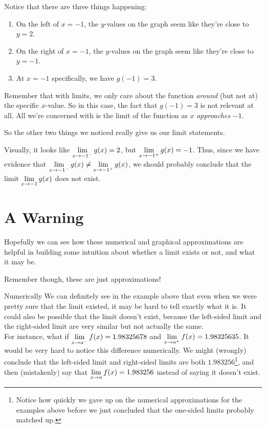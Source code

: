 Notice that there are three things happening:
\begin{enumerate}
  \item On the left of $x=-1$, the $y$-values on the graph seem like they're close to $y=2$.
  \item On the right of $x=-1$, the $y$-values on the graph seem like they're close to $y=-1$.
  \item At $x=-1$ specifically, we have $g(-1)=3$.
\end{enumerate}

Remember that with limits, we only care about the function \textit{around} (but not at) the specific $x$-value.
So in this case, the fact that $g(-1)=3$ is not relevant at all.
All we're concerned with is the limit of the function as $x$ \textit{approaches} $-1$.

So the other two things we noticed really give us our limit statements.

Visually, it looks like $\displaystyle \lim_{x\to -1^-} g(x) = 2$, but $\displaystyle \lim_{x\to -1^+} g(x) = -1$. Thus, since we have evidence that $\displaystyle \lim_{x\to -1^-} g(x) \neq \displaystyle \lim_{x\to -1^+} g(x)$, we should probably conclude that the limit $\displaystyle \lim_{x\to -1} g(x)$ does not exist.

\section*{A Warning}

Hopefully we can see how these numerical and graphical approximations are helpful in building some intuition about whether a limit exists or not, and what it may be.

Remember though, these are just approximations!
\begin{defn}{Numerically}
  We can definitely see in the example above that even when we were pretty sure that the limit existed, it may be hard to tell exactly what it is.
  It could also be possible that the limit doesn't exist, because the left-sided limit and the right-sided limit are very similar but not actually the same.\\

  For instance, what if $\displaystyle \lim_{x\to a^-} f(x) = 1.98325678$ and $\displaystyle \lim_{x\to a^+} f(x) = 1.98325635$.
  It would be very hard to notice this difference numerically.
  We might (wrongly) conclude that the left-sided limit and right-sided limits are both $1.983256$\footnote{Notice how quickly we gave up on the numerical approximations for the examples above before we just concluded that the one-sided limits probably matched up.}, and then (mistakenly) say that $\displaystyle \lim_{x\to a} f(x)=1.983256$ instead of saying it doesn't exist.
\end{defn}


